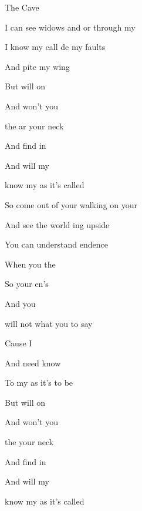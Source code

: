 \begin{SBSong}{The Cave}
\begin{SBVerse}
        I can see widows and or through my 
        
        I know my call de my faults
        
        And pite my wing   
  \end{SBVerse}
  \CBPageBrk
  \begin{SBVerse}
        But  will  on 
        
        And  won't  you 
        
         the  ar your neck
   
        And  find  in 
  
        And  will  my 
        
         know my  as it's called 
  \end{SBVerse}
  \begin{SBVerse}
        So come out of your  walking on your 
        
        And see the world ing upside 
        
        You can understand endence
        
        When you  the    
  \end{SBVerse}
  \begin{SBVerse}
        So  your en's 
        
        And   you 
        
         will not  what you  to say
        
        Cause I   
        
        And need  know 
        
        To  my  as it's  to be
  \end{SBVerse}
  \begin{SBVerse}
        But  will  on 
        
        And  won't  you  
        
         the   your neck
   
        And  find  in 
  
        And  will  my 
        
         know my  as it's called    
  \end{SBVerse}
        
\end{SBSong}        
      
